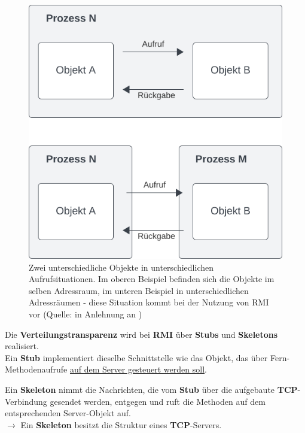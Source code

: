 \begin{figure}
    \centering
    \includegraphics[scale=0.5]{chapters/fopt5/img/rmi/processcall}
    \caption{Zwei unterschiedliche Objekte in unterschiedlichen Aufrufsituationen. Im oberen Beispiel befinden sich die Objekte im selben Adressraum, im unteren Beispiel in unterschiedlichen Adressräumen - diese Situation kommt bei der Nutzung von RMI vor (Quelle: in Anlehnung an \cite[311 f., Abbildung 6.1 und 6.2]{Oec22})}
    \label{fig:processcall}
\end{figure}

\noindent
Die \textbf{Verteilungstransparenz} wird bei \textbf{RMI} über \textbf{Stubs} und \textbf{Skeletons} realisiert.\\

\noindent
Ein \textbf{Stub} implementiert dieselbe Schnittstelle wie das Objekt, das über Fern-Methodenaufrufe \ul{auf dem Server gesteuert werden soll}.

\noindent
Ein \textbf{Skeleton} nimmt die Nachrichten, die vom \textbf{Stub} über die aufgebaute \textbf{TCP}-Verbindung gesendet werden, entgegen und ruft die Methoden auf dem entsprechenden Server-Objekt auf.\\
$\rightarrow$ Ein \textbf{Skeleton} besitzt die Struktur eines \textbf{TCP}-Servers.

